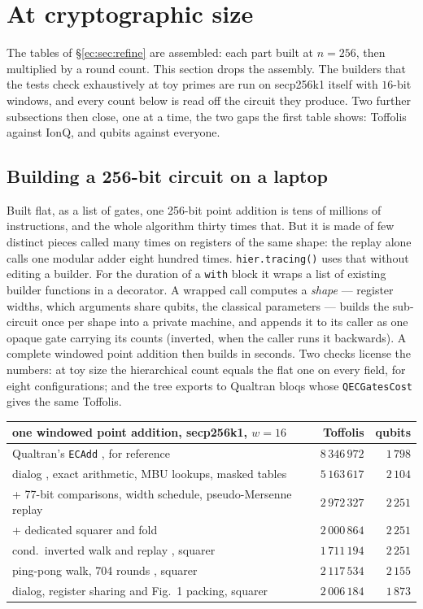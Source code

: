 \documentclass[11pt]{article}
\theoremstyle{plain}
\theoremstyle{remark}
\begin{document}
\section{At cryptographic size}\label{ec:sec:n256}

The tables of \S\ref{ec:sec:refine} are assembled: each part built at $n=256$, then multiplied by a
round count. This section drops the assembly. The builders that the tests check exhaustively at
toy primes are run on secp256k1 itself with $16$-bit windows, and every count below is read off
the circuit they produce. Two further subsections then close, one at a time, the two gaps the
first table shows: Toffolis against IonQ, and qubits against everyone.

\subsection{Building a 256-bit circuit on a laptop}

Built flat, as a list of gates, one 256-bit point addition is tens of millions of instructions,
and the whole algorithm thirty times that. But it is made of few distinct pieces called many times
on registers of the same shape: the replay alone calls one modular adder eight hundred times.
\texttt{hier.tracing()} uses that without editing a builder. For the duration of a \texttt{with}
block it wraps a list of existing builder functions in a decorator. A wrapped call computes a
\emph{shape} --- register widths, which arguments share qubits, the classical parameters --- builds
the sub-circuit once per shape into a private machine, and appends it to its caller as one opaque
gate carrying its counts (inverted, when the caller runs it backwards). A complete windowed point
addition then builds in seconds. Two checks license the numbers: at toy size the hierarchical count
equals the flat one on every field, for eight configurations; and the tree exports to Qualtran
bloqs whose \texttt{QECGatesCost} gives the same Toffolis.

\begin{center}\small
\begin{tabular}{lrr}
\toprule
one windowed point addition, secp256k1, $w=16$ & Toffolis & qubits\\
\midrule
Qualtran's \texttt{ECAdd} \cite{ec:litinski23}, for reference & $8\,346\,972$ & $1\,798$\\
dialog \cite{ec:schrott26}, exact arithmetic, MBU lookups, masked tables & $5\,163\,617$ & $2\,104$\\
\quad + 77-bit comparisons, width schedule, pseudo-Mersenne replay & $2\,972\,327$ & $2\,251$\\
\quad + dedicated squarer and fold & $2\,000\,864$ & $2\,251$\\
cond.\ inverted walk and replay \cite{ec:ionq26}, squarer & $1\,711\,194$ & $2\,251$\\
ping-pong walk, 704 rounds \cite{ec:ecdsafail26}, squarer & $2\,117\,534$ & $2\,155$\\
dialog, register sharing and Fig.~1 packing, squarer & $2\,006\,184$ & $1\,873$\\
\bottomrule
\end{tabular}
\end{center}
\end{document}
